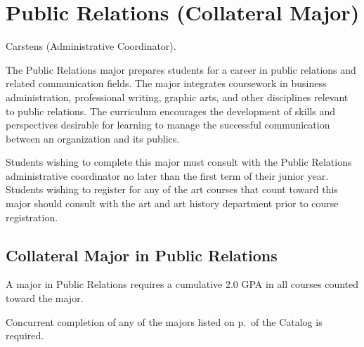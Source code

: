 \documentclass[
  letterpaper,
]{scrbook}
\begin{document}
\section{Public Relations (Collateral
Major)}\label{public-relations-collateral-major}

Carstens (Administrative Coordinator).

The Public Relations major prepares students for a career in public
relations and related communication fields. The major integrates
coursework in business administration, professional writing, graphic
arts, and other disciplines relevant to public relations. The curriculum
encourages the development of skills and perspectives desirable for
learning to manage the successful communication between an organization
and its publics.

Students wishing to complete this major must consult with the Public
Relations administrative coordinator no later than the first term of
their junior year. Students wishing to register for any of the art
courses that count toward this major should consult with the art and art
history department prior to course registration.

\subsection{Collateral Major in Public
Relations}\label{collateral-major-in-public-relations}

A major in Public Relations requires a cumulative 2.0 GPA in all courses
counted toward the major.

Concurrent completion of any of the majors listed on p.~of the Catalog
is required.
\end{document}
